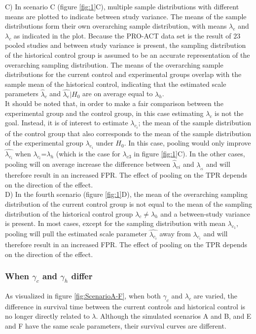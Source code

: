 \documentclass[Royal,sagev,times]{sagej}
\begin{document}
C) In scenario C (figure \ref{fig:1}C), multiple sample distributions with different means are plotted to indicate between study variance. The means of the sample distributions form their own overarching sample distribution, with means $\lambda_{e}$ and $\lambda_{c}$ as indicated in the plot. Because the PRO-ACT data set is the result of $23$ pooled studies and between study variance is present, the sampling distribution of the historical control group is assumed to be an accurate representation of the overarching sampling distribution. The means of the overarching sample distributions for the current control and experimental groups overlap with the sample mean of the historical control, indicating that the estimated scale parameters $\hat{\lambda}_{c}$ and $\hat{\lambda_e}|H_0$ are on average equal to $\lambda_{h}$. \\
It should be noted that, in order to make a fair comparison between the experimental group and the control group, in this case estimating $\lambda_{c}$ is not the goal. Instead, it is of interest to estimate $\lambda_{c_{i}}$; the mean of the sample distribution of the control group that also corresponds to the mean of the sample distribution of the experimental group $\lambda_{e_{i}}$ under $H_0$. In this case, pooling would only improve $\hat{\lambda_{c_{i}}}$ when $\lambda_{c_{i}}$=$\lambda_{h}$ (which is the case for $\lambda_{c3}$ in figure \ref{fig:1}C). In the other cases, pooling will on average increase the difference between $\hat{\lambda}_{ci}$ and $\lambda__{ci}$ and will therefore result in an increased FPR. The effect of pooling on the TPR depends on the direction of the effect. \\

D) In the fourth scenario (figure \ref{fig:1}D), the mean of the overarching sampling distribution of the current control group is not equal to the mean of the sampling distribution of the historical control group  $\lambda_{c}\neq\lambda_{h}$ and a between-study variance is present. In most cases, except for the sampling distribution with mean $\lambda_{c_1}$, pooling will pull the estimated scale parameter $\hat{\lambda_{c_{i}}}$ away from $\lambda_{c_{i}}$ and will therefore result in an increased FPR. The effect of pooling on the TPR depends on the direction of the effect.\\

\subsubsection{When $\gamma_{c}$ and $\gamma_{h}$ differ}
As visualized in figure \ref{fig:ScenarioA-F}, when both $\gamma_c$ and $\lambda_c$ are varied, the difference in survival time between the current controls and historical control is no longer directly related to $\lambda$. Although the simulated scenarios A and B, and E and F have the same scale parameters, their survival curves are different. 
\end{document}
